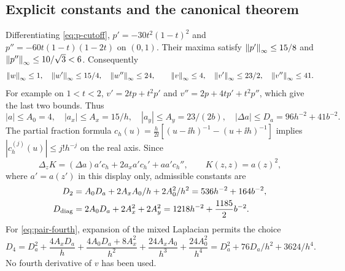 \subsection{Explicit constants and the canonical theorem}

Differentiating \eqref{eq:p-cutoff},
$p'=-30t^2(1-t)^2$ and
$p''=-60t(1-t)(1-2t)$ on $(0,1)$.
Their maxima satisfy
$\left\|p'\right\|_\infty\le15/8$ and
$\left\|p''\right\|_\infty\le10/\sqrt3<6$.
Consequently
\[
 \left\|w\right\|_\infty\le1,\quad \left\|w'\right\|_\infty\le15/4,\quad
 \left\|w''\right\|_\infty\le24,\qquad
 \left\|v\right\|_\infty\le4,\quad \left\|v'\right\|_\infty\le23/2,\quad
 \left\|v''\right\|_\infty\le41.
\]
For example on $1<t<2$,
$v'=2tp+t^2p'$ and
$v''=2p+4tp'+t^2p''$, which give the last two bounds.
Thus
\begin{equation}\label{eq:a-bounds}
 |a|\le A_0=4,\quad |a_x|\le A_x=15/h,\quad
 |a_y|\le A_y=23/(2b),\quad
 |\Delta a|\le D_a=96h^{-2}+41b^{-2}.
\end{equation}
The partial fraction formula
$c_h(u)=\frac{h}{2\ii}[(u-\ii h)^{-1}-(u+\ii h)^{-1}]$
implies $|c_h^{(j)}(u)|\le j!h^{-j}$ on the real axis.
Since
\[
 \Delta_zK=(\Delta a)a'c_h+2a_xa'c_h'+aa'c_h'',
 \qquad K(z,z)=a(z)^2,
\]
where $a'=a(z')$ in this display only, admissible constants are
\begin{align}
 D_2&=A_0D_a+2A_xA_0/h+2A_0^2/h^2
       =536h^{-2}+164b^{-2},\label{eq:D2}\\
 D_{\rm diag}
   &=2A_0D_a+2A_x^2+2A_y^2
       =1218h^{-2}+\frac{1185}{2}b^{-2}.\label{eq:Ddiag}
\end{align}
For \eqref{eq:pair-fourth}, expansion of the mixed Laplacian permits
the choice
\[
 D_4= D_a^2+\frac{4A_xD_a}{h}
 +\frac{4A_0D_a+8A_x^2}{h^2}
 +\frac{24A_xA_0}{h^3}+\frac{24A_0^2}{h^4}
 =D_a^2+76D_a/h^2+3624/h^4.
\]
No fourth derivative of $v$ has been used.

